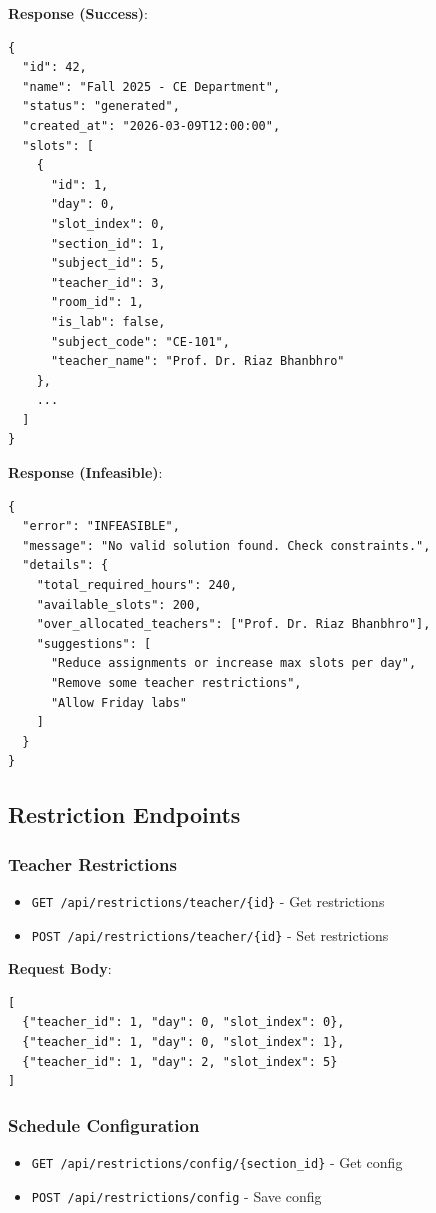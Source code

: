 \documentclass[12pt,a4paper]{article}
\begin{document}
\textbf{Response (Success)}:
\begin{verbatim}
{
  "id": 42,
  "name": "Fall 2025 - CE Department",
  "status": "generated",
  "created_at": "2026-03-09T12:00:00",
  "slots": [
    {
      "id": 1,
      "day": 0,
      "slot_index": 0,
      "section_id": 1,
      "subject_id": 5,
      "teacher_id": 3,
      "room_id": 1,
      "is_lab": false,
      "subject_code": "CE-101",
      "teacher_name": "Prof. Dr. Riaz Bhanbhro"
    },
    ...
  ]
}
\end{verbatim}

\textbf{Response (Infeasible)}:
\begin{verbatim}
{
  "error": "INFEASIBLE",
  "message": "No valid solution found. Check constraints.",
  "details": {
    "total_required_hours": 240,
    "available_slots": 200,
    "over_allocated_teachers": ["Prof. Dr. Riaz Bhanbhro"],
    "suggestions": [
      "Reduce assignments or increase max slots per day",
      "Remove some teacher restrictions",
      "Allow Friday labs"
    ]
  }
}
\end{verbatim}

\subsection{Restriction Endpoints}

\subsubsection{Teacher Restrictions}
\begin{itemize}
    \item \texttt{GET /api/restrictions/teacher/\{id\}} - Get restrictions
    \item \texttt{POST /api/restrictions/teacher/\{id\}} - Set restrictions
\end{itemize}

\textbf{Request Body}:
\begin{verbatim}
[
  {"teacher_id": 1, "day": 0, "slot_index": 0},
  {"teacher_id": 1, "day": 0, "slot_index": 1},
  {"teacher_id": 1, "day": 2, "slot_index": 5}
]
\end{verbatim}

\subsubsection{Schedule Configuration}
\begin{itemize}
    \item \texttt{GET /api/restrictions/config/\{section\_id\}} - Get config
    \item \texttt{POST /api/restrictions/config} - Save config
\end{itemize}
\end{document}
